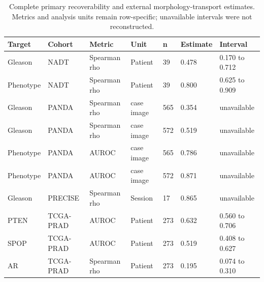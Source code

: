 \begin{table}[H]
\centering
\scriptsize
\caption{Complete primary recoverability and external morphology-transport estimates. Metrics and analysis units remain row-specific; unavailable intervals were not reconstructed.}
\label{tab:primary-evidence}
\begin{tabular}{@{}p{}p{}p{}p{}p{}p{}p{}@{}}
\toprule
Target & Cohort & Metric & Unit & n & Estimate & Interval \\
\midrule
Gleason & NADT & Spearman rho & Patient & 39 & 0.478 & 0.170 to 0.712 \\
Phenotype & NADT & Spearman rho & Patient & 39 & 0.800 & 0.625 to 0.909 \\
Gleason & PANDA & Spearman rho & case image & 565 & 0.354 & unavailable \\
Gleason & PANDA & Spearman rho & case image & 572 & 0.519 & unavailable \\
Phenotype & PANDA & AUROC & case image & 565 & 0.786 & unavailable \\
Phenotype & PANDA & AUROC & case image & 572 & 0.871 & unavailable \\
Gleason & PRECISE & Spearman rho & Session & 17 & 0.865 & unavailable \\
PTEN & TCGA-PRAD & AUROC & Patient & 273 & 0.632 & 0.560 to 0.706 \\
SPOP & TCGA-PRAD & AUROC & Patient & 273 & 0.519 & 0.408 to 0.627 \\
AR & TCGA-PRAD & Spearman rho & Patient & 273 & 0.195 & 0.074 to 0.310 \\
\bottomrule
\end{tabular}
\end{table}
